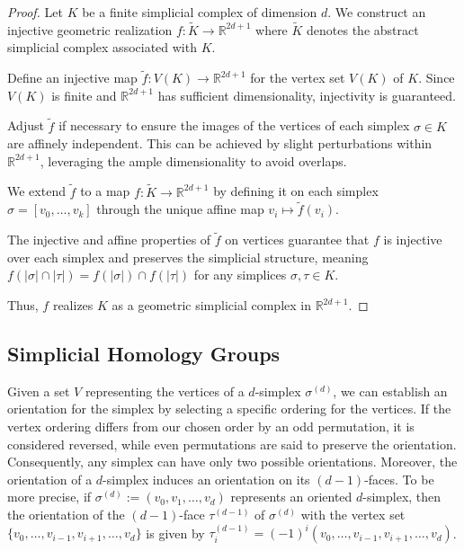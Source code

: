 \begin{proof}
Let \(K\) be a finite simplicial complex of dimension \(d\). We construct an injective geometric realization \( f: \tilde{K} \to \mathbb{R}^{2d+1} \) where \( \tilde{K} \) denotes the abstract simplicial complex associated with \( K \).

Define an injective map \( \tilde{f}: V(K) \to \mathbb{R}^{2d+1} \) for the vertex set \( V(K) \) of \( K \). Since \( V(K) \) is finite and \(\mathbb{R}^{2d+1}\) has sufficient dimensionality, injectivity is guaranteed.

Adjust \( \tilde{f} \) if necessary to ensure the images of the vertices of each simplex \(\sigma \in K\) are affinely independent. This can be achieved by slight perturbations within \(\mathbb{R}^{2d+1}\), leveraging the ample dimensionality to avoid overlaps.

We extend \( \tilde{f} \) to a map \( f: \tilde{K} \to \mathbb{R}^{2d+1} \) by defining it on each simplex \(\sigma = [v_0, \ldots, v_k]\) through the unique affine map $v_i \mapsto \tilde{f}(v_i)$.

The injective and affine properties of \( \tilde{f} \) on vertices guarantee that \( f \) is injective over each simplex and preserves the simplicial structure, meaning \( f(|\sigma| \cap |\tau|) = f(|\sigma|) \cap f(|\tau|) \) for any simplices \(\sigma, \tau \in K\).

Thus, \( f \) realizes \( K \) as a geometric simplicial complex in \(\mathbb{R}^{2d+1}\).
\end{proof}

\subsection{Simplicial Homology Groups}
\label{simplicialhomology}
Given a set $V$ representing the vertices of a $d$-simplex $\sigma^{(d)}$, we can establish an orientation for the simplex by selecting a specific ordering for the vertices. If the vertex ordering differs from our chosen order by an odd permutation, it is considered reversed, while even permutations are said to preserve the orientation. Consequently, any simplex can have only two possible orientations. Moreover, the orientation of a $d$-simplex induces an orientation on its $(d-1)$-faces. To be more precise, if $\sigma^{(d)} := (v_0, v_1, \ldots, v_d)$ represents an oriented $d$-simplex, then the orientation of the $(d-1)$-face $\tau^{(d-1)}$ of $\sigma^{(d)}$ with the vertex set $\{v_0,\ldots,v_{i-1},v_{i+1},\ldots,v_d\}$ is given by $\tau_i^{(d-1)} = (-1)^i (v_0, \ldots,v_{i-1},v_{i+1},\ldots,v_d)$.

